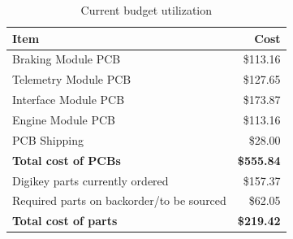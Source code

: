\documentclass[12pt]{report}
\begin{document}
    \begin{table}[H]
      \begin{centering}
	\caption{Current budget utilization}\label{tab:budget}
	\begin{tabular}{|l|r|}
	  \hline 
	  \textbf{Item} & \textbf{Cost}\tabularnewline
	  \hline
	  \hline 
	  Braking Module PCB & \$113.16\tabularnewline
	  \hline 
	  Telemetry Module PCB & \$127.65\tabularnewline
	  \hline 
	  Interface Module PCB & \$173.87\tabularnewline
	  \hline 
	  Engine Module PCB & \$113.16\tabularnewline
	  \hline 
	  PCB Shipping & \$28.00\tabularnewline
	  \hline
	  \hline 
	  \textbf{Total cost of PCBs} & \textbf{\$555.84}\tabularnewline
	  \hline
	  \hline 
	  Digikey parts currently ordered & \$157.37\tabularnewline
	  \hline 
	  Required parts on backorder/to be sourced & \$62.05\tabularnewline
	  \hline
	  \hline 
	  \textbf{Total cost of parts} & \textbf{\$219.42}\tabularnewline
	  \hline
	\end{tabular}
	\par
      \end{centering}
    \end{table}

\pagebreak
\end{document}
